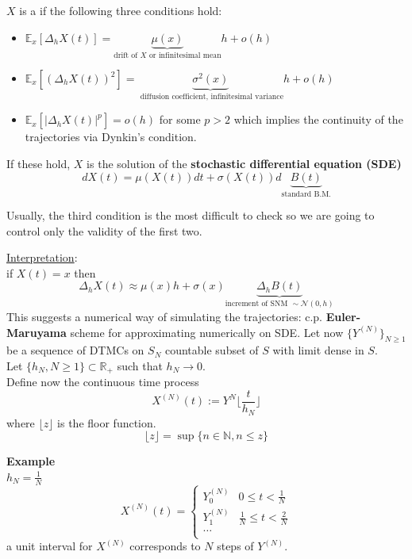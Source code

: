 \documentclass{article}
\begin{document}
\begin{definition}
	$X$ is a  if the following three conditions hold:
	\begin{itemize}
		\item $\mathbb{E}_x[\Delta _h X(t)]= \underbrace{\mu(x)}_{\text{drift of }X \text{ or infinitesimal mean}}h + o(h) $
		\item $\mathbb{E}_x[(\Delta_h X(t))^2]= \underbrace{\sigma^2(x)}_{\text{ diffusion coefficient, infinitesimal variance}} h + o(h)$
		\item $\mathbb{E}_x[|\Delta_h X(t)|^p]= o(h)$ for some $p >  2$ which implies the continuity of the trajectories via Dynkin's condition.
	\end{itemize}
	If these hold, $X$ is the solution of the \textbf{stochastic differential equation (SDE)} 
	\begin{equation*}
		dX(t) = \mu(X(t))dt + \sigma(X(t)) d \underbrace{B(t)}_{\text{standard B.M.}}
	\end{equation*}
\end{definition}
\begin{remark}
	Usually, the third condition is the most difficult to check so we are going to control only the validity of the first two.
\end{remark}
\underline{Interpretation}:\\
if $X(t)=x$ then
\begin{equation*}
	\Delta_h X(t) \approx \mu(x)h + \sigma (x) \underbrace{\Delta_h B(t)}_{\text{increment of SNM } \sim \mathcal{N}(0,h)}
\end{equation*}
This suggests a numerical way of simulating the trajectories: c.p. \textbf{Euler-Maruyama} scheme for approximating numerically on SDE. Let now $\{Y^{(N)}\}_{N \geq 1}$ be a sequence of DTMCs on $S_N$ countable subset of $S$ with limit dense in $S$.\\
Let $\{h_N, N \geq 1\} \subset \mathbb{R}_+$ such that $h_N \rightarrow 0$. \\
Define now the continuous time process 
\begin{equation*}
	X^{(N)}(t):= Y^{N}\lfloor \frac{t}{h_N} \rfloor
\end{equation*}
where $\lfloor z \rfloor$ is the floor function.
$$\lfloor z \rfloor = \sup\{n\in \mathbb{N},n \leq z\}$$
\begin{figure}[H]
	\centering
	
\end{figure}
\textbf{Example} \\
$h_N = \frac{1}{N}$
\begin{equation*}
	X^{(N)}(t) = 
	\begin{cases}
		Y_0^{(N)} & 0 \leq t < \frac{1}{N}\\
		Y_1^{(N)} & \frac{1}{N} \leq t < \frac{2}{N}\\
		\ldots & \\
	\end{cases}
\end{equation*}
a unit interval for $X^{(N)}$ corresponds to $N$ steps of $Y^{(N)}$. \\
\end{document}
